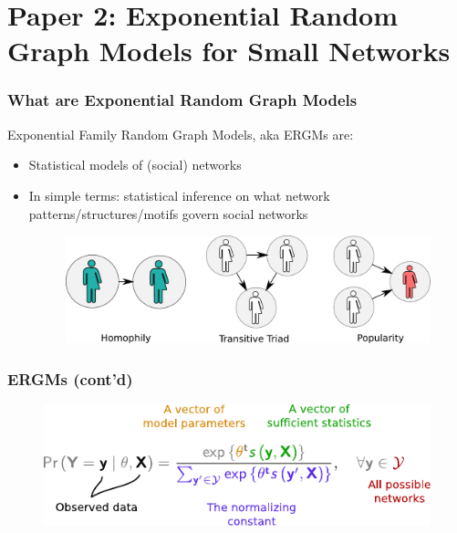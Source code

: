\documentclass[aspectratio=169, 9pt]{beamer}
\begin{document}
\section{Paper 2: Exponential Random Graph Models for Small Networks}


\begin{frame}
\frametitle{What are Exponential Random Graph Models}

Exponential Family Random Graph Models, aka \alert{ERGMs} are:\pause

\begin{itemize}[<+->]
\item Statistical models of (social) networks
\item In simple terms: statistical inference on what network patterns/structures/motifs
govern social networks
\begin{figure}
\includegraphics[width=.6\linewidth]{friendly-terms.pdf}
\end{figure}
\end{itemize}

\end{frame}

\begin{frame}[label=ergmeq]
\frametitle{ERGMs (cont'd)}
\begin{figure}
\centering
\includegraphics[width=.7\linewidth]{parts-of-ergm.pdf}
\end{figure}


\end{frame}
\end{document}
